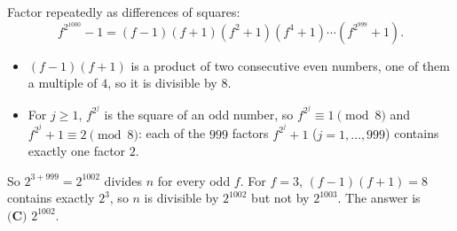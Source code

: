 Factor repeatedly as differences of squares:
\[f^{2^{1000}}-1=(f-1)(f+1)(f^2+1)(f^4+1)\cdots\left(f^{2^{999}}+1\right).\]
\begin{itemize}
\item $(f-1)(f+1)$ is a product of two consecutive even numbers, one of them a multiple of $4$, so it is divisible by $8$.
\item For $j\ge1$, $f^{2^j}$ is the square of an odd number, so $f^{2^j}\equiv1\pmod8$ and $f^{2^j}+1\equiv2\pmod 8$: each of the $999$ factors $f^{2^j}+1$ ($j=1,\ldots,999$) contains exactly one factor $2$.
\end{itemize}
So $2^{3+999}=2^{1002}$ divides $n$ for every odd $f$. For $f=3$, $(f-1)(f+1)=8$ contains exactly $2^3$, so $n$ is divisible by $2^{1002}$ but not by $2^{1003}$. The answer is $\boxed{\textbf{(C) } 2^{1002}}$.
